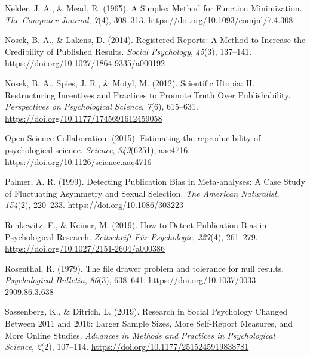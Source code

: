 \documentclass[
  12pt,
]{scrartcl}
\newlength{\cslhangindent}
\newenvironment{CSLReferences}[2] %
 {\begin{list}{}{%
  \setlength{\itemindent}{0pt}
  \setlength{\leftmargin}{0pt}
  \setlength{\parsep}{0pt}
  \ifodd #1
   \setlength{\leftmargin}{\cslhangindent}
   \setlength{\itemindent}{-1\cslhangindent}
  \fi
  \setlength{\itemsep}{#2\baselineskip}}}
 {\end{list}}
\begin{document}
\begin{CSLReferences}{1}{0}
Nelder, J. A., \& Mead, R. (1965). A {Simplex} {Method} for {Function}
{Minimization}. \emph{The Computer Journal}, \emph{7}(4), 308--313.
\url{https://doi.org/10.1093/comjnl/7.4.308}

Nosek, B. A., \& Lakens, D. (2014). Registered {Reports}: {A} {Method}
to {Increase} the {Credibility} of {Published} {Results}. \emph{Social
Psychology}, \emph{45}(3), 137--141.
\url{https://doi.org/10.1027/1864-9335/a000192}

Nosek, B. A., Spies, J. R., \& Motyl, M. (2012). Scientific {Utopia}:
{II}. {Restructuring} {Incentives} and {Practices} to {Promote} {Truth}
{Over} {Publishability}. \emph{Perspectives on Psychological Science},
\emph{7}(6), 615--631. \url{https://doi.org/10.1177/1745691612459058}

Open Science Collaboration. (2015). Estimating the reproducibility of
psychological science. \emph{Science}, \emph{349}(6251), aac4716.
\url{https://doi.org/10.1126/science.aac4716}

Palmer, A. R. (1999). Detecting {Publication} {Bias} in {Meta}‐analyses:
{A} {Case} {Study} of {Fluctuating} {Asymmetry} and {Sexual}
{Selection}. \emph{The American Naturalist}, \emph{154}(2), 220--233.
\url{https://doi.org/10.1086/303223}

Renkewitz, F., \& Keiner, M. (2019). How to {Detect} {Publication}
{Bias} in {Psychological} {Research}. \emph{Zeitschrift Für
Psychologie}, \emph{227}(4), 261--279.
\url{https://doi.org/10.1027/2151-2604/a000386}

Rosenthal, R. (1979). The file drawer problem and tolerance for null
results. \emph{Psychological Bulletin}, \emph{86}(3), 638--641.
\url{https://doi.org/10.1037/0033-2909.86.3.638}

Sassenberg, K., \& Ditrich, L. (2019). Research in {Social} {Psychology}
{Changed} {Between} 2011 and 2016: {Larger} {Sample} {Sizes}, {More}
{Self}-{Report} {Measures}, and {More} {Online} {Studies}.
\emph{Advances in Methods and Practices in Psychological Science},
\emph{2}(2), 107--114. \url{https://doi.org/10.1177/2515245919838781}


\end{CSLReferences}
\end{document}
